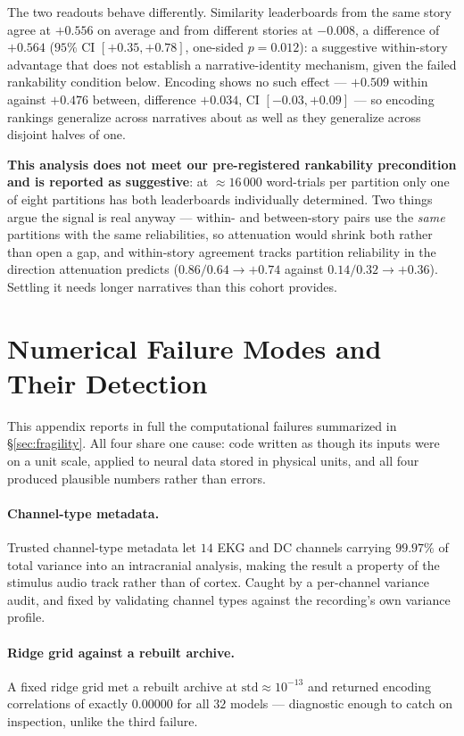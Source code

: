 \documentclass{article}
\begin{document}
The two readouts behave differently. Similarity leaderboards from the same story agree at
$+0.556$ on average and from different stories at $-0.008$, a difference of $+0.564$
($95\%$ CI $[+0.35, +0.78]$, one-sided $p = 0.012$): a suggestive within-story advantage that does not establish a narrative-identity mechanism,
given the failed rankability condition below. Encoding shows no such effect --- $+0.509$ within against
$+0.476$ between, difference $+0.034$, CI $[-0.03, +0.09]$ --- so encoding rankings generalize
across narratives about as well as they generalize across disjoint halves of one.

\textbf{This analysis does not meet our pre-registered rankability precondition and is reported as
suggestive}: at $\approx 16\,000$ word-trials per partition only one of eight partitions has both leaderboards
individually determined. Two things argue the signal is real anyway --- within- and between-story
pairs use the \emph{same} partitions with the same reliabilities, so attenuation would shrink both
rather than open a gap, and within-story agreement tracks partition reliability in the direction
attenuation predicts ($0.86/0.64 \to +0.74$ against $0.14/0.32 \to +0.36$). Settling it needs
longer narratives than this cohort provides.

\section{Numerical Failure Modes and Their Detection}\label{app:fragility}

This appendix reports in full the computational failures summarized in \S\ref{sec:fragility}.
All four share one cause: code written as though its inputs were on a unit scale, applied to
neural data stored in physical units, and all four produced plausible numbers rather than errors.

\paragraph{Channel-type metadata.} Trusted channel-type metadata let $14$ EKG and DC channels
carrying $99.97\%$ of total variance into an intracranial analysis, making the result a property
of the stimulus audio track rather than of cortex. Caught by a per-channel variance audit, and
fixed by validating channel types against the recording's own variance profile.

\paragraph{Ridge grid against a rebuilt archive.} A fixed ridge grid met a rebuilt archive at
$\mathrm{std} \approx 10^{-13}$ and returned encoding correlations of exactly $0.00000$ for all
$32$ models --- diagnostic enough to catch on inspection, unlike the third failure.
\end{document}
